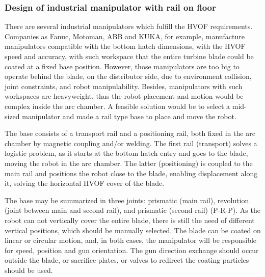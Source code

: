 \subsubsection{Design of industrial manipulator with rail on
floor}\label{proj_manip}

There are several industrial manipulators which fulfill the HVOF requirements.
Companies as Fanuc, Motoman, ABB and KUKA, for example, manufacture manipulators
compatible with the bottom hatch dimensions, with the HVOF speed and accuracy,
with such workspace that the entire turbine blade could be coated at a fixed
base position. However, those manipulators are too big to operate behind the
blade, on the distributor side, due to environment collision, joint
constraints, and robot manipulability. Besides, manipulators with such
workspaces are heavyweight, thus the robot placement and motion would be complex
inside the arc chamber. A feasible solution would be to select a
mid-sized manipulator and made a rail type base to place and move the robot.


The base consists of a transport rail and a positioning rail, both fixed
in the arc chamber by magnetic coupling and/or welding. The first rail
(transport) solves a logistic problem, as it starts at the bottom hatch entry
and goes to the blade, moving the robot in the arc chamber. The latter
(positioning) is coupled to the main rail and positions the robot close to the
blade, enabling displacement along it, solving the horizontal HVOF cover of the
blade.

The base may be summarized in three joints: prismatic (main rail), revolution
(joint between main and second rail), and prismatic (second rail) (P-R-P). As
the robot can not vertically cover the entire blade, there is still the need of
different vertical positions, which should be manually selected. The blade can
be coated on linear or circular motion, and, in both cases, the manipulator will
be responsible for speed, position and gun orientation. The gun direction
exchange should occur outside the blade, or sacrifice plates, or valves to
redirect the coating particles should be used.

